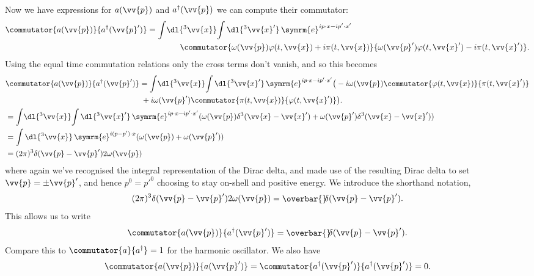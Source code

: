 \documentclass[fleqn]{NotesClass}
\newcommand{\e}{\symrm{e}}
\newcommand{\hermit}{{\dagger}}
\newcommand\bardelta{\ThisStyle{\ensurestackMath{%
            \stackengine{-.3\LMpt}{\SavedStyle \delta}{\SavedStyle\overbar{}%
                \mkern4.5mu}{O}{r}{F}{F}{L}}}}
\begin{document}
    Now we have expressions for \(a(\vv{p})\) and \(a^\hermit(\vv{p})\) we can compute their commutator:
    \begin{align}
        \commutator{a(\vv{p})}{a^\hermit(\vv{p}')} &= \int \! \dl{^3\vv{x}} \! \int \dl{^3\vv{x}'} \, \e^{ip\cdot x - ip'\cdot x'}\\
        &\qquad\qquad\commutator{\omega(\vv{p}) \varphi(t, \vv{x}) + i\pi(t, \vv{x})}{\omega(\vv{p}')\varphi(t, \vv{x}') - i\pi(t, \vv{x}')}. \notag
    \end{align}
    Using the equal time commutation relations only the cross terms don't vanish, and so this becomes
    \begin{align}
        &\commutator{a(\vv{p})}{a^\hermit(\vv{p}')} = \int \! \dl{^3\vv{x}} \! \int \dl{^3\vv{x}'} \, \e^{ip\cdot x - ip'\cdot x'} \big(-i\omega(\vv{p})\commutator{\varphi(t, \vv{x})}{\pi(t, \vv{x}')}\\
        &\hspace{17.5em}+ i\omega(\vv{p}')\commutator{\pi(t, \vv{x})}{\varphi(t, \vv{x}')}\big). \notag\\
        &= \int \! \dl{^3\vv{x}} \! \int \dl{^3\vv{x}'} \, \e^{ip\cdot x - ip'\cdot x'} (\omega(\vv{p}) \delta^3(\vv{x} - \vv{x}') + \omega(\vv{p}') \delta^3(\vv{x} - \vv{x}'))\\
        &= \int \dl{^3\vv{x}} \, \e^{i(p - p')\cdot x} (\omega(\vv{p}) + \omega(\vv{p}'))\\
        &= (2\pi)^3 \delta(\vv{p} - \vv{p}') 2\omega(\vv{p})
    \end{align}
    where again we've recognised the integral representation of the Dirac delta, and made use of the resulting Dirac delta to set \(\vv{p} = \pm \vv{p}'\), and hence \(p^0 = p'^0\) choosing to stay on-shell and positive energy.
    We introduce the shorthand notation,
    \begin{equation}
        (2\pi)^3 \delta(\vv{p} - \vv{p}') 2\omega(\vv{p}) = \bardelta(\vv{p} - \vv{p}').
    \end{equation}
    This allows us to write
    \begin{equation}
        \commutator{a(\vv{p})}{a^\hermit(\vv{p}')} = \bardelta(\vv{p} - \vv{p}').
    \end{equation}
    Compare this to \(\commutator{a}{a^\hermit} = 1\) for the harmonic oscillator.
    We also have
    \begin{equation}
        \commutator{a(\vv{p})}{a(\vv{p}')} = \commutator{a^\hermit(\vv{p}')}{a^\hermit(\vv{p}')} = 0.
    \end{equation}
    
\end{document}
